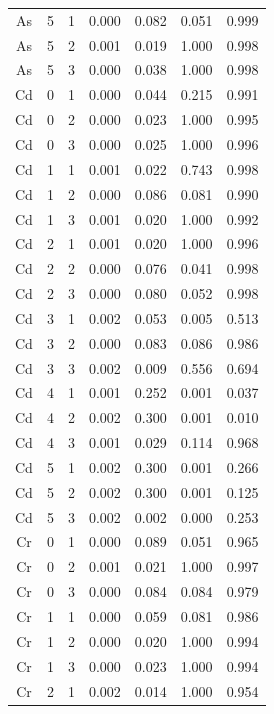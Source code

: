 \documentclass[ms, hidelinks]{uncgdissertationexp}
\theoremstyle{plain}
\theoremstyle{definition}
\theoremstyle{remark}
\begin{document}
\begin{longtable}{ccccccc}
As & 5 & 1 & 0.000 & 0.082 & 0.051 & 0.999\\
\rowcolor{gray!6}  As & 5 & 2 & 0.001 & 0.019 & 1.000 & 0.998\\
As & 5 & 3 & 0.000 & 0.038 & 1.000 & 0.998\\
\rowcolor{gray!6}  Cd & 0 & 1 & 0.000 & 0.044 & 0.215 & 0.991\\
Cd & 0 & 2 & 0.000 & 0.023 & 1.000 & 0.995\\
\rowcolor{gray!6}  Cd & 0 & 3 & 0.000 & 0.025 & 1.000 & 0.996\\
Cd & 1 & 1 & 0.001 & 0.022 & 0.743 & 0.998\\
\rowcolor{gray!6}  Cd & 1 & 2 & 0.000 & 0.086 & 0.081 & 0.990\\
Cd & 1 & 3 & 0.001 & 0.020 & 1.000 & 0.992\\
\rowcolor{gray!6}  Cd & 2 & 1 & 0.001 & 0.020 & 1.000 & 0.996\\
Cd & 2 & 2 & 0.000 & 0.076 & 0.041 & 0.998\\
\rowcolor{gray!6}  Cd & 2 & 3 & 0.000 & 0.080 & 0.052 & 0.998\\
Cd & 3 & 1 & 0.002 & 0.053 & 0.005 & 0.513\\
\rowcolor{gray!6}  Cd & 3 & 2 & 0.000 & 0.083 & 0.086 & 0.986\\
Cd & 3 & 3 & 0.002 & 0.009 & 0.556 & 0.694\\
\rowcolor{gray!6}  Cd & 4 & 1 & 0.001 & 0.252 & 0.001 & 0.037\\
Cd & 4 & 2 & 0.002 & 0.300 & 0.001 & 0.010\\
\rowcolor{gray!6}  Cd & 4 & 3 & 0.001 & 0.029 & 0.114 & 0.968\\
Cd & 5 & 1 & 0.002 & 0.300 & 0.001 & 0.266\\
\rowcolor{gray!6}  Cd & 5 & 2 & 0.002 & 0.300 & 0.001 & 0.125\\
Cd & 5 & 3 & 0.002 & 0.002 & 0.000 & 0.253\\
\rowcolor{gray!6}  Cr & 0 & 1 & 0.000 & 0.089 & 0.051 & 0.965\\
Cr & 0 & 2 & 0.001 & 0.021 & 1.000 & 0.997\\
\rowcolor{gray!6}  Cr & 0 & 3 & 0.000 & 0.084 & 0.084 & 0.979\\
Cr & 1 & 1 & 0.000 & 0.059 & 0.081 & 0.986\\
\rowcolor{gray!6}  Cr & 1 & 2 & 0.000 & 0.020 & 1.000 & 0.994\\
Cr & 1 & 3 & 0.000 & 0.023 & 1.000 & 0.994\\
\rowcolor{gray!6}  Cr & 2 & 1 & 0.002 & 0.014 & 1.000 & 0.954\\

\end{longtable}
\end{document}

